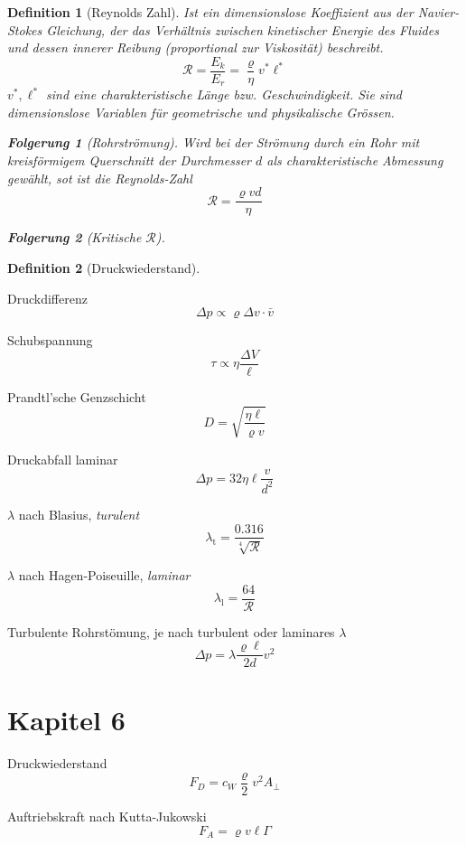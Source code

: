 \documentclass[a4paper, twocolumn]{article}
\numberwithin{equation}{section}
\theoremstyle{hsr-def}
\newtheorem{definition}{Definition}[section]
\theoremstyle{hsr-sub}
\newtheorem{result}{Folgerung}[definition]
\theoremstyle{hsr-unnum}
\begin{document}
\begin{definition}[Reynolds Zahl]
Ist ein dimensionslose Koeffizient aus der \emph{Navier-Stokes} Gleichung, der das Verh\"altnis zwischen kinetischer Energie des Fluides und dessen innerer Reibung (proportional zur Viskosit\"at) beschreibt.
\[
    \mathcal{R} = \frac{E_k}{E_r} = \frac{\varrho}{\eta} v^*\ell^*
\]
\(v^*, \ell^*\) sind eine charakteristische L\"ange bzw. Geschwindigkeit. Sie sind dimensionslose Variablen f\"ur geometrische und physikalische Gr\"ossen.

\begin{result}[Rohrstr\"omung]
Wird bei der Str\"omung durch ein Rohr mit kreisf\"ormigem Querschnitt der Durchmesser \(d\) als charakteristische Abmessung gew\"ahlt, sot ist die Reynolds-Zahl
\[
    \mathcal{R} = \frac{\varrho v d}{\eta}
\]
\end{result}

\begin{result}[Kritische \(\mathcal{R}\)]

\end{result}
\end{definition}

\begin{definition}[Druckwiederstand]
\end{definition}


Druckdifferenz
\[
    \Delta p \propto \varrho \Delta v \cdot \bar{v}
\]

Schubspannung
\[
    \tau \propto \eta\frac{\Delta V}{\ell}
\]


Prandtl'sche Genzschicht
\[
    D = \sqrt{\frac{\eta\ell}{\varrho v}}
\]

Druckabfall laminar
\[
    \Delta p = 32\eta\ell \frac{v}{d^2}
\]

\(\lambda\) nach Blasius, \emph{turulent}
\[
    \lambda_\text{t} = \frac{0.316}{\sqrt[4]{\mathcal{R}}}
\]

\(\lambda\) nach Hagen-Poiseuille, \emph{laminar}
\[
    \lambda_\text{l} = \frac{64}{\mathcal{R}}
\]

Turbulente Rohrst\"omung, je nach turbulent oder laminares \(\lambda\) 
\[
    \Delta p = \lambda \frac{\varrho\ell}{2d} v^2
\]

\section*{Kapitel 6}
Druckwiederstand
\[
    F_D = c_W \frac{\varrho}{2}v^2 A_\perp
\]

Auftriebskraft nach Kutta-Jukowski
\[
    F_A = \varrho v \ell \Gamma
\]
\end{document}

